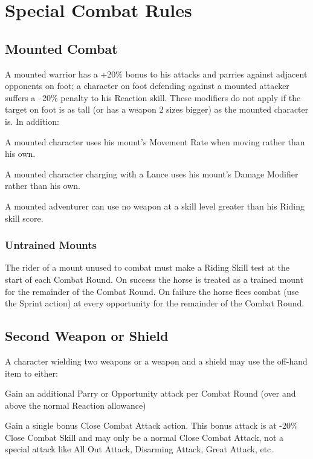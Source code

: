 \section{Special Combat Rules}

\subsection{Mounted Combat}
A mounted warrior has a +20\% bonus to his attacks and parries against adjacent opponents on foot; a character on foot defending against a mounted attacker suffers a –20\% penalty to his Reaction skill. These modifiers do not apply if the target on foot is as tall (or has a weapon 2 sizes bigger) as the mounted character is. In addition:
\begin{rpg-list}
\item A mounted character uses his mount’s Movement Rate when moving rather than his own.
\item A mounted character charging with a Lance uses his mount’s Damage Modifier rather than his own.
\item A mounted adventurer can use no weapon at a skill level greater than his Riding skill score. 
\end{rpg-list}

\subsubsection{Untrained Mounts}
The rider of a mount unused to combat must make a Riding Skill test at the start of each Combat Round.
On success the horse is treated as a trained mount for the remainder of the Combat Round. 
On failure the horse flees combat (use the Sprint action) at every opportunity for the remainder of the Combat Round. 

\subsection{Second Weapon or Shield}
A character wielding two weapons or a weapon and a shield may use the off-hand item to either: 
\begin{rpg-list}
\item Gain an additional Parry or Opportunity attack per Combat Round (over and above the normal Reaction allowance)
\item Gain a single bonus Close Combat Attack action. This bonus attack is at -20\% Close Combat Skill and may only be a normal Close Combat Attack, not a special attack like All Out Attack, Disarming Attack, Great Attack, etc.
\end{rpg-list}

